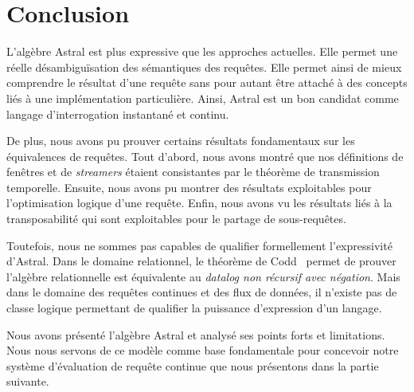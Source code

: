 \section{Conclusion}\label{sec:valid:expressivite:conclusion}
L'algèbre Astral est plus expressive que les approches actuelles. Elle permet une réelle désambiguïsation des sémantiques des requêtes. Elle permet ainsi de mieux comprendre le résultat d'une requête sans pour autant être attaché à des concepts liés à une implémentation particulière. Ainsi, Astral est un bon candidat comme langage d'interrogation instantané et continu.

De plus, nous avons pu prouver certains résultats fondamentaux sur les équivalences de requêtes. Tout d'abord, nous avons montré que nos définitions de fenêtres et de \textit{streamers} étaient consistantes par le théorème de transmission temporelle. Ensuite, nous avons pu montrer des résultats exploitables pour l'optimisation logique d'une requête. Enfin, nous avons vu les résultats liés à la transposabilité qui sont exploitables pour le partage de sous-requêtes.

Toutefois, nous ne sommes pas capables de qualifier formellement l'expressivité d'Astral. Dans le domaine relationnel, le théorème de Codd~\cite{Codd:theorem} permet de prouver l'algèbre relationnelle est équivalente au \textit{datalog non récursif avec négation}. Mais dans le domaine des requêtes continues et des flux de données, il n'existe pas de classe logique permettant de qualifier la puissance d'expression d'un langage.

Nous avons présenté l'algèbre Astral et analysé ses points forts et limitations. Nous nous servons de ce modèle comme base fondamentale pour concevoir notre système d'évaluation de requête continue que nous présentons dans la partie suivante.
